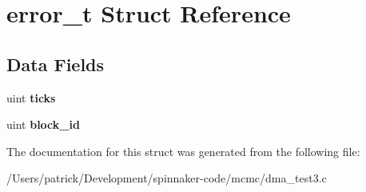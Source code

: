 \hypertarget{structerror__t}{}\section{error\+\_\+t Struct Reference}
\label{structerror__t}
\subsection*{Data Fields}
\begin{DoxyCompactItemize}
\item 
uint {\bfseries ticks}\hypertarget{structerror__t_a7fcd6915876e066781399d7b00f1b1f0}{}\label{structerror__t_a7fcd6915876e066781399d7b00f1b1f0}

\item 
uint {\bfseries block\+\_\+id}\hypertarget{structerror__t_a7b75e2fe9a123db63e6a8af12aa0db1e}{}\label{structerror__t_a7b75e2fe9a123db63e6a8af12aa0db1e}

\end{DoxyCompactItemize}


The documentation for this struct was generated from the following file\+:\begin{DoxyCompactItemize}
\item 
/\+Users/patrick/\+Development/spinnaker-\/code/mcmc/dma\+\_\+test3.\+c\end{DoxyCompactItemize}
